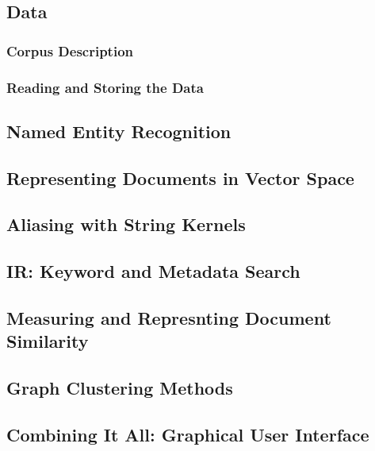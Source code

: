 \subsection{Data}\label{sec:data}
\subsubsection{Corpus Description}\label{sec:description_of_the_castro_archive}

\subsubsection{Reading and Storing the Data}\label{sec:reading_and_storing_the_data}

\subsection{Named Entity Recognition}\label{sec:stanford_named_entity_recognizer}


\subsection{Representing Documents in Vector Space}\label{sec:representing_documents_in_vector_space}


\subsection{Aliasing with String Kernels}\label{sec:aliasing}


\subsection{IR: Keyword and Metadata Search}\label{sec:aliasing}


\subsection{Measuring and Represnting Document Similarity}\label{sec:aliasing}


\subsection{Graph Clustering Methods}\label{sec:graph_clustering_methods}



\subsection{Combining It All: Graphical User Interface}\label{sec:gui}

